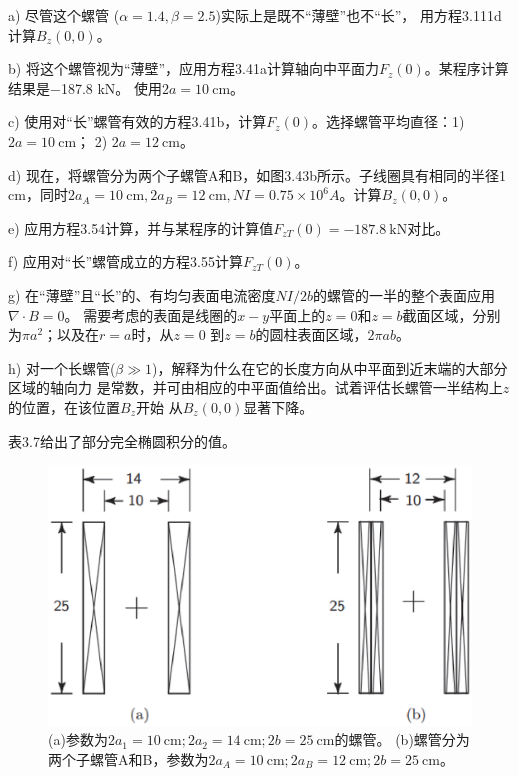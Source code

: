 a) 尽管这个螺管 ($\alpha = 1.4,\beta = 2.5$)实际上是既不“薄壁”也不“长”，
用方程3.111d计算$B_z(0, 0)$。

b) 将这个螺管视为“薄壁”，应用方程3.41a计算轴向中平面力$F_z(0)$。某程序计算结果是−187.8 kN。
使用$2a=10\ \mathrm{cm}$。

c) 使用对“长”螺管有效的方程3.41b，计算$F_z(0)$。选择螺管平均直径：1) $2a =10\ \mathrm{cm}$； 2) $2a=12\ \mathrm{cm}$。

d) 现在，将螺管分为两个子螺管A和B，如图3.43b所示。子线圈具有相同的半径1 cm，同时$2a_A=10\ \mathrm{cm}, 2a_B=12\ \mathrm{cm},
NI =0.75\times10^6 A$。计算$B_z(0, 0)$。

e) 应用方程3.54计算，并与某程序的计算值$F_{zT}(0)=−187.8\ \mathrm{kN}$对比。

f) 应用对“长”螺管成立的方程3.55计算$F_{zT}(0)$。

g) 在“薄壁”且“长”的、有均匀表面电流密度$NI/2b$的螺管的一半的整个表面应用$\nabla\cdot B=0$。
需要考虑的表面是线圈的$x-y$平面上的$z=0$和$z=b$截面区域，分别为$\pi a^2$；以及在$r=a$时，从$z=0$
到$z=b$的圆柱表面区域，$2\pi ab$。

h) 对一个长螺管($\beta\gg 1$)，解释为什么在它的长度方向从中平面到近末端的大部分区域的轴向力
是常数，并可由相应的中平面值给出。试着评估长螺管一半结构上$z$的位置，在该位置$B_z$开始
从$B_z(0,0)$显著下降。

表3.7给出了部分完全椭圆积分的值。
\begin{figure}[htbp]
	\centering
	\includegraphics[scale=0.5]{chpt3/figs/fig3.43.eps}
	\caption{(a)参数为$2a_1=10\ \mathrm{cm}; 2a_2=14\ \mathrm{cm}; 2b=25\ \mathrm{cm}$的螺管。
		(b)螺管分为两个子螺管A和B，参数为$2a_A=10\ \mathrm{cm}; 2a_B=12\ \mathrm{cm}; 2b=25\ \mathrm{cm}$。}
\end{figure}


